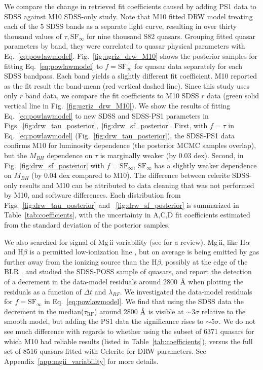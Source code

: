 \documentclass[twocolumn]{aastex62}
\let\oldAA\AA
\renewcommand{\AA}{\text{\normalfont\oldAA}}
\newcommand{\project}[1]{\textsf{#1}}
\begin{document}
We compare the change in retrieved fit coefficients caused by adding PS1 data to SDSS against M10 SDSS-only study. Note that M10 fitted  DRW model treating each of the 5 SDSS bands as a separate light curve, resulting in over thirty thousand values of $\tau, \mathrm{SF}_{\infty}$ for nine thousand S82 quasars. Grouping fitted quasar parameters by band, they were correlated to quasar physical parameters with Eq.~\ref{eq:powlawmodel}. Fig.~\ref{fig:ugriz_drw_M10} shows the posterior samples for fitting  Eq.~\ref{eq:powlawmodel} to $f=\mathrm{SF}_{\infty}$ for quasar data separately for each SDSS bandpass.  Each band yields a slightly different fit coefficient. M10 reported as the fit result the band-mean (red vertical dashed line). Since this study uses only $r$ band data, we compare the fit coefficients to M10 SDSS $r$ data (green solid vertical line in Fig.~\ref{fig:ugriz_drw_M10}). We show the results of fitting Eq.~\ref{eq:powlawmodel} to new SDSS and SDSS-PS1 parameters in Figs.~\ref{fig:drw_tau_posterior},~\ref{fig:drw_sf_posterior}. First, with $f=\tau$ in Eq.~\ref{eq:powlawmodel} (Fig.~\ref{fig:drw_tau_posterior}), the SDSS-PS1 data confirms M10 for luminosity dependence (the posterior MCMC samples overlap), but the $M_{BH}$ dependence on $\tau$ is marginally weaker (by 0.03 dex). Second, in Fig.~\ref{fig:drw_sf_posterior} with  $f=\mathrm{SF}_{\infty}$, $\mathrm{SF}_{\infty}$ has a slightly weaker dependence on $M_{BH}$ (by 0.04 dex compared to M10). The difference between \project{celerite} SDSS-only results and M10 can be attributed to data cleaning that was not performed by M10, and software differences. Each distribution from 
Figs.~\ref{fig:drw_tau_posterior} and ~\ref{fig:drw_sf_posterior} is summarized in Table~\ref{tab:coefficients}, with the uncertainty in A,C,D fit coefficients estimated from  the standard deviation of the posterior samples. 

We also searched for signal of Mg\,{\sc ii} variability (see \citealt{cackett2015} for a review). Mg\,{\sc ii}, like  H$\alpha$  and  H$\beta$  is a permitted low-ionization line \citep{yang2019}, but on average is being emitted by gas further away from the ionizing source than the  H$\beta$, possibly at the edge of the BLR \citep{guo2019}. \cite{ivezic2004} and \cite{macleod2012} studied the SDSS-POSS sample of quasars, and report the detection of a decrement in the data-model residuals around 2800 $\mbox{\AA}$ when plotting the residuals as a function of $\Delta t$ and $\lambda_{RF}$. We investigated the data-model residuals for $f=\mathrm{SF}_{\infty}$ in Eq.~\ref{eq:powlawmodel}. We find that using the SDSS data the decrement in the median($\tau_{\mathrm{RF}}$) around 2800 $\mbox{\AA}$ is visible at $\sim 3 \sigma$  relative to the smooth model, but adding the PS1 data the significance rises to $\sim 5 \sigma$. We do not see much difference with regards to whether using the subset of 6371 quasars for which M10 had reliable results (listed in Table~\ref{tab:coefficients}), versus  the full set of 8516 quasars fitted with Celerite for DRW parameters. See Appendix~\ref{app:mgii_variability} for more details. 
\end{document}
